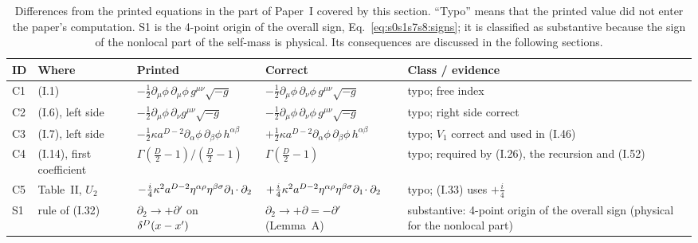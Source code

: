 \documentclass[aps,prd,onecolumn,10pt,nofootinbib,floatfix]{revtex4-2}
\newcommand{\PI}{Paper~I}
\newcommand{\eqI}[1]{(I.#1)}
\begin{document}
\begin{table}[tb]
\caption{Differences from the printed equations in the part of \PI{}
covered by this section. ``Typo'' means that the printed value did not
enter the paper's computation. S1 is the 4-point origin of the overall
sign, Eq.~\eqref{eq:s0s1s7s8:signs}; it is classified as substantive
because the sign of the nonlocal part of the self-mass is physical. Its
consequences are discussed in the following sections.}
\label{tab:s2:summary}
\begin{ruledtabular}
\begin{tabular}{>{\raggedright\arraybackslash}p{}>{\raggedright\arraybackslash}p{}>{\raggedright\arraybackslash}p{}>{\raggedright\arraybackslash}p{}>{\raggedright\arraybackslash}p{}}
ID & Where & Printed & Correct & Class / evidence\\
\hline
C1 & \eqI{1} & $-\tfrac12\partial_\mu\phi\,\partial_\mu\phi\,g^{\mu\nu}\sqrt{-g}$ & $-\tfrac12\partial_\mu\phi\,\partial_\nu\phi\,g^{\mu\nu}\sqrt{-g}$ & typo; free index\\
C2 & \eqI{6}, left side & $-\tfrac12\partial_\mu\phi\,\partial_\nu g^{\mu\nu}\sqrt{-g}$ & $-\tfrac12\partial_\mu\phi\,\partial_\nu\phi\,g^{\mu\nu}\sqrt{-g}$ & typo; right side correct\\
C3 & \eqI{7}, left side & $-\tfrac12\kappa a^{D-2}\partial_\alpha\phi\,\partial_\beta\phi\,h^{\alpha\beta}$ & $+\tfrac12\kappa a^{D-2}\partial_\alpha\phi\,\partial_\beta\phi\,h^{\alpha\beta}$ & typo; $V_1$ correct and used in \eqI{46}\\
C4 & \eqI{14}, first coefficient & $\Gamma(\tfrac D2-1)/(\tfrac D2-1)$ & $\Gamma(\tfrac D2-1)$ & typo; required by \eqI{26}, the recursion and \eqI{52}\\
C5 & Table~II, $U_2$ & $-\tfrac i4\kappa^2a^{D-2}\eta^{\alpha\rho}\eta^{\beta\sigma}\partial_1\!\cdot\partial_2$ & $+\tfrac i4\kappa^2a^{D-2}\eta^{\alpha\rho}\eta^{\beta\sigma}\partial_1\!\cdot\partial_2$ & typo; \eqI{33} uses $+\tfrac i4$\\
S1 & rule of \eqI{32} & $\partial_2\to+\partial'$ on $\delta^D(x-x')$ & $\partial_2\to+\partial=-\partial'$ (Lemma~A) & substantive: 4-point origin of the overall sign (physical for the nonlocal part)\\
\end{tabular}
\end{ruledtabular}
\end{table}

\providecommand{\sthreedel}{\delta^D(x-x')}
\providecommand{\sthreedelf}{\delta^4(x-x')}
\providecommand{\sthreeM}{M^2_{\rm 4pt}}
\providecommand{\sthreeK}{\mathcal K}
\providecommand{\sthreec}[1]{i\bigl[#1\bigr](x;x)}
\end{document}
